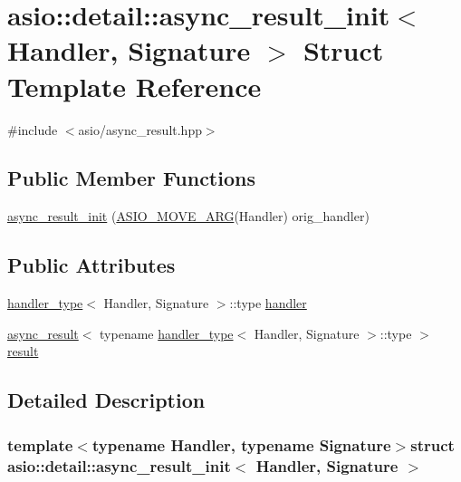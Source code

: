 \hypertarget{structasio_1_1detail_1_1async__result__init}{}\section{asio\+:\+:detail\+:\+:async\+\_\+result\+\_\+init$<$ Handler, Signature $>$ Struct Template Reference}
\label{structasio_1_1detail_1_1async__result__init}


{\ttfamily \#include $<$asio/async\+\_\+result.\+hpp$>$}

\subsection*{Public Member Functions}
\begin{DoxyCompactItemize}
\item 
\hyperlink{structasio_1_1detail_1_1async__result__init_a4c1ad81be7a8fdaa35f1795095cff6a4}{async\+\_\+result\+\_\+init} (\hyperlink{group__async__read_ga6d72a97784dde9476c6d93b8904a4967}{A\+S\+I\+O\+\_\+\+M\+O\+V\+E\+\_\+\+A\+R\+G}(Handler) orig\+\_\+handler)
\end{DoxyCompactItemize}
\subsection*{Public Attributes}
\begin{DoxyCompactItemize}
\item 
\hyperlink{structasio_1_1handler__type}{handler\+\_\+type}$<$ Handler, Signature $>$\+::type \hyperlink{structasio_1_1detail_1_1async__result__init_a98d6b00c3b24c37ea22b5293b70e4005}{handler}
\item 
\hyperlink{classasio_1_1async__result}{async\+\_\+result}$<$ typename \hyperlink{structasio_1_1handler__type}{handler\+\_\+type}$<$ Handler, Signature $>$\+::type $>$ \hyperlink{structasio_1_1detail_1_1async__result__init_a6b805f5a8bcfddb4f6766b0fb7f0d837}{result}
\end{DoxyCompactItemize}


\subsection{Detailed Description}
\subsubsection*{template$<$typename Handler, typename Signature$>$struct asio\+::detail\+::async\+\_\+result\+\_\+init$<$ Handler, Signature $>$}



